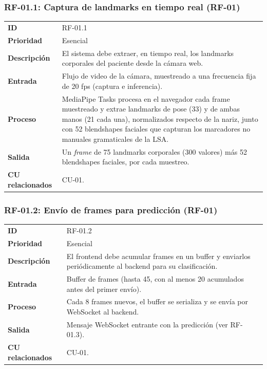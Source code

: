 \subsubsection{RF-01.1: Captura de landmarks en tiempo real (RF-01)}
\begin{table}[H]
\centering
\begin{tabularx}{\textwidth}{l X}
\toprule
\textbf{ID} & RF-01.1 \\
\textbf{Prioridad} & Esencial \\
\textbf{Descripción} & El sistema debe extraer, en tiempo real, los landmarks corporales del paciente desde la cámara web. \\
\textbf{Entrada} & Flujo de video de la cámara, muestreado a una frecuencia fija de 20 fps (captura e inferencia). \\
\textbf{Proceso} & MediaPipe Tasks procesa en el navegador cada frame muestreado y extrae landmarks de pose (33) y de ambas manos (21 cada una), normalizados respecto de la nariz, junto con 52 blendshapes faciales que capturan los marcadores no manuales gramaticales de la LSA. \\
\textbf{Salida} & Un \textit{frame} de 75 landmarks corporales (300 valores) más 52 blendshapes faciales, por cada muestreo. \\
\textbf{CU relacionados} & CU-01. \\
\bottomrule
\end{tabularx}
\end{table}

\subsubsection{RF-01.2: Envío de frames para predicción (RF-01)}
\begin{table}[H]
\centering
\begin{tabularx}{\textwidth}{l X}
\toprule
\textbf{ID} & RF-01.2 \\
\textbf{Prioridad} & Esencial \\
\textbf{Descripción} & El frontend debe acumular frames en un buffer y enviarlos periódicamente al backend para su clasificación. \\
\textbf{Entrada} & Buffer de frames (hasta 45, con al menos 20 acumulados antes del primer envío). \\
\textbf{Proceso} & Cada 8 frames nuevos, el buffer se serializa y se envía por WebSocket al backend. \\
\textbf{Salida} & Mensaje WebSocket entrante con la predicción (ver RF-01.3). \\
\textbf{CU relacionados} & CU-01. \\
\bottomrule
\end{tabularx}
\end{table}

